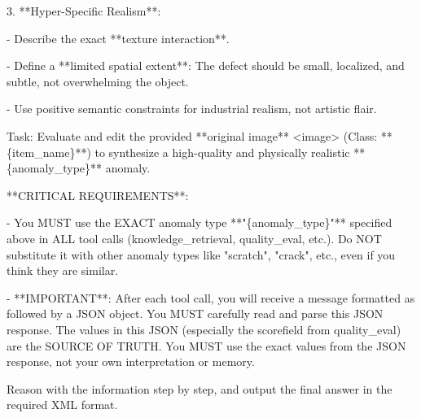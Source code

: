 \documentclass[sigconf]{acmart}
\begin{document}
\begin{tcolorbox}
3. **Hyper-Specific Realism**:

- Describe the exact **texture interaction**.

- Define a **limited spatial extent**: The defect should be small, localized, and subtle, not overwhelming the object.

- Use positive semantic constraints for industrial realism, not artistic flair.

\end{tcolorbox}


\newpage

\begin{tcolorbox}[
    enhanced,
    breakable,             %
    width=\textwidth,      %
    colframe=prompt_front,
    colback=prompt_back,
    coltitle=white,
    boxrule=1pt,
    arc=8pt,
    left=10pt, right=10pt, top=10pt, bottom=10pt,
    fonttitle=\fontsize{14pt}{12pt}\bfseries,
    fontupper=\fontsize{10pt}{12pt}\rmfamily,
    title=\textbf{User Prompt},
]
Task: Evaluate and edit the provided **original image** <image> (Class: **\{item\_name\}**) to synthesize a high-quality and physically realistic **\{anomaly\_type\}** anomaly.
\vspace{1.5em}

**CRITICAL REQUIREMENTS**:

- You MUST use the EXACT anomaly type **"\{anomaly\_type\}"** specified above in ALL tool calls (knowledge\_retrieval, quality\_eval, etc.). Do NOT substitute it with other anomaly types like "scratch", "crack", etc., even if you think they are similar.

- **IMPORTANT**: After each tool call, you will receive a message formatted as \textquotesingle followed by a JSON object. You MUST carefully read and parse this JSON response. The values in this JSON (especially the \textquotesingle score\textquotesingle field from \textquotesingle quality\_eval\textquotesingle) are the SOURCE OF TRUTH. You MUST use the exact values from the JSON response, not your own interpretation or memory.
\vspace{1.5em}

Reason with the information step by step, and output the final answer in the required XML format.
\end{tcolorbox}

\vspace{1em}
\end{document}
